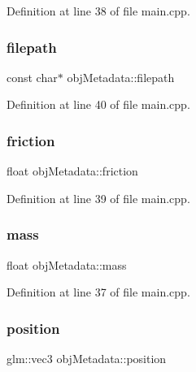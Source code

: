 Definition at line 38 of file main.\+cpp.

\mbox{\label{structobj_metadata_a7e922e759ce7c08f2f70c47034b1880a}} 
\subsubsection{\texorpdfstring{filepath}{filepath}}
{\footnotesize\ttfamily const char$\ast$ obj\+Metadata\+::filepath}



Definition at line 40 of file main.\+cpp.

\mbox{\label{structobj_metadata_a672e831325e522dd8fe5eecbab6a6f94}} 
\subsubsection{\texorpdfstring{friction}{friction}}
{\footnotesize\ttfamily float obj\+Metadata\+::friction}



Definition at line 39 of file main.\+cpp.

\mbox{\label{structobj_metadata_ac2df1bad1e332a30af67e57a55a93930}} 
\subsubsection{\texorpdfstring{mass}{mass}}
{\footnotesize\ttfamily float obj\+Metadata\+::mass}



Definition at line 37 of file main.\+cpp.

\mbox{\label{structobj_metadata_aa08b002e6a99770d0c68e03ab25088ff}} 
\subsubsection{\texorpdfstring{position}{position}}
{\footnotesize\ttfamily glm\+::vec3 obj\+Metadata\+::position}



